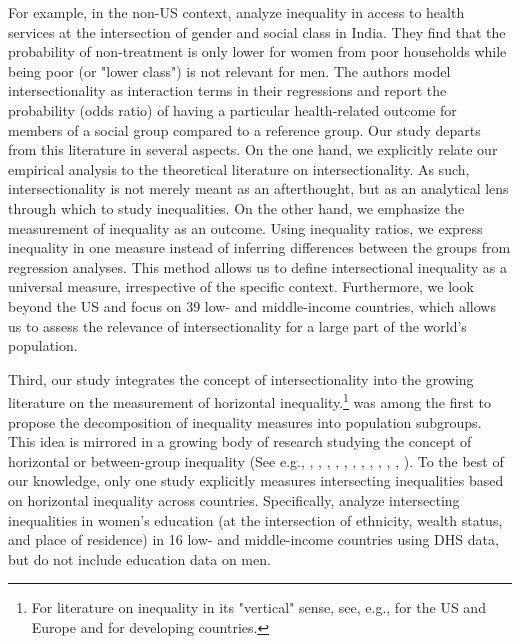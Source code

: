 For example, in the non-US context, \cite{Sen2009} analyze inequality in access to health services at the intersection of gender and social class in India. They find that the probability of non-treatment is only lower for women from poor households while being poor (or "lower class") is not relevant for men. The authors model intersectionality as interaction terms in their regressions and report the probability (odds ratio) of having a particular health-related outcome for members of a social group compared to a reference group. Our study departs from this literature in several aspects. On the one hand, we explicitly relate our empirical analysis to the theoretical literature on intersectionality. As such, intersectionality is not merely meant as an afterthought, but as an analytical lens through which to study inequalities. On the other hand, we emphasize the measurement of inequality as an outcome. Using inequality ratios, we express inequality in one measure instead of inferring differences between the groups from regression analyses. This method allows us to define intersectional inequality as a universal measure, irrespective of the specific context. Furthermore, we look beyond the US and focus on 39 low- and middle-income countries, which allows us to assess the relevance of intersectionality for a large part of the world's population.

Third, our study integrates the concept of intersectionality into the growing literature on the measurement of horizontal inequality.\footnote{For literature on inequality in its "vertical" sense, see, e.g., \cite{Piketty2014} for the US and Europe and \cite{Ravallion2014} for developing countries.} \cite{Shorrocks1984} was among the first to propose the decomposition of inequality measures into population subgroups. This idea is mirrored in a growing body of research studying the concept of horizontal or between-group inequality (See e.g., \cite{Langer2005}, \cite{Langer2007}, \cite{Mancini2008}, \cite{Mancini2008a}, \cite{Stewart2009}, \cite{Elbers2008}, \cite{Cederman2011}, \cite{Cederman2015}, \cite{Canelas2018}, \cite{Leivas2018}, \cite{McDoom2019}, \cite{Tetteh-Baah2019}). To the best of our knowledge, only one study explicitly measures intersecting inequalities based on horizontal inequality across countries. Specifically, \cite{Lenhardt2015} analyze intersecting inequalities in women's education (at the intersection of ethnicity, wealth status, and place of residence) in 16 low- and middle-income countries using DHS data, but do not include education data on men.

